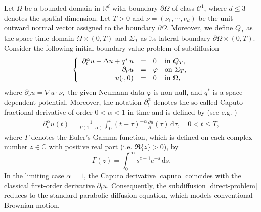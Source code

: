 \documentclass[a4paper,12pt,reqno,natbib]{amsart}
\newcommand{\dss} {\displaystyle\mathrm{d}s}
\begin{document}
Let $\Omega$ be a bounded domain in $\mathbb{R}^d$ with boundary $\partial\Omega$ of class $\mathcal{C}^1$, where $d \leq 3$ denotes the spatial dimension. Let $T>0$ and $\nu =(\nu_1,\cdots, \nu_d)$ be the unit outward normal vector assigned to the boundary $\partial\Omega$. Moreover, we define $Q_T$ as the space-time domain $\Omega \times (0, T)$ and $\Sigma_T$ as its lateral boundary $\partial\Omega \times (0, T)$. Consider the following initial boundary value problem of subdiffusion \cite{JinRun,Barbook,LiSINUM22,LiMC24}
%
\begin{eqnarray} \label{direct-problem}
\left\{
  \begin{array}{rcll}
    \partial_{t} ^{\alpha} u-\Delta  u +q^*\,  u&=&0&\hbox{in}\ Q_T, \\
    \displaystyle \partial_\nu u&=&\varphi &\hbox{on}\  \Sigma_T, \\
   u(\cdot,0)&=&0  &\hbox{in}\ \Omega,
  \end{array}
\right.
\end{eqnarray}
where $\partial_\nu u=\nabla u\cdot\nu,$ the given Neumann data $\varphi$ is non-null, and $q^*$ is a space-dependent potential. Moreover, the notation $\partial_{t} ^{\alpha}$ denotes the so-called Caputo fractional derivative of order $0<\alpha<1$ in time and is defined by (see e.g. \cite{JinZhou2023})
%
%
\begin{align} \label{caputo}
\partial_t^\alpha  u(t)=
         \displaystyle\frac{1}{\Gamma(1-\alpha)}\int_0^t(t-\tau)^{-\alpha} \frac{\partial  u}{\partial \tau}(\tau)\, \displaystyle\mathrm{d}\tau,\quad0<t\leq T,
\end{align}
where $\Gamma$ denotes the Euler's Gamma function, which is defined on each complex number $z\in \mathbb{C}$ with positive real part (i.e. $\mathfrak{R}\{z\}>0$), by
%
\begin{equation*}
    \Gamma(z)=\int_0^\infty s^{z-1}e^{-s}\,\dss.
\end{equation*}
In the limiting case $\alpha = 1$, the Caputo derivative \eqref{caputo} coincides with the classical first-order derivative $\partial_t u$. Consequently, the subdiffusion \eqref{direct-problem} reduces to the standard parabolic diffusion equation, which models conventional Brownian motion.
\end{document}
